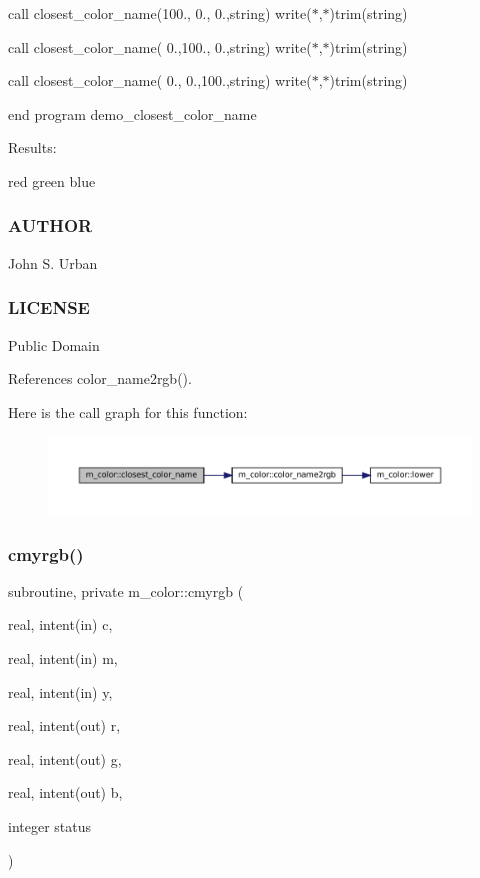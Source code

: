 call closest\+\_\+color\+\_\+name(100., 0., 0.,string) write($\ast$,$\ast$)trim(string)

call closest\+\_\+color\+\_\+name( 0.,100., 0.,string) write($\ast$,$\ast$)trim(string)

call closest\+\_\+color\+\_\+name( 0., 0.,100.,string) write($\ast$,$\ast$)trim(string)

end program demo\+\_\+closest\+\_\+color\+\_\+name

Results\+:

red green blue

\subsubsection*{A\+U\+T\+H\+OR}

John S. Urban

\subsubsection*{L\+I\+C\+E\+N\+SE}

Public Domain 

References color\+\_\+name2rgb().

Here is the call graph for this function\+:
\nopagebreak
\begin{figure}[H]
\begin{center}
\leavevmode
\includegraphics[width=350pt]{namespacem__color_acad72628ee0b77cf87f40cd46734fb18_cgraph}
\end{center}
\end{figure}
\mbox{\label{namespacem__color_ab91687e87d0901874e52efe5933e3044}} 
\subsubsection{\texorpdfstring{cmyrgb()}{cmyrgb()}}
{\footnotesize\ttfamily subroutine, private m\+\_\+color\+::cmyrgb (\begin{DoxyParamCaption}\item[{real, intent(in)}]{c,  }\item[{real, intent(in)}]{m,  }\item[{real, intent(in)}]{y,  }\item[{real, intent(out)}]{r,  }\item[{real, intent(out)}]{g,  }\item[{real, intent(out)}]{b,  }\item[{integer}]{status }\end{DoxyParamCaption})\hspace{0.3cm}{\ttfamily [private]}}


